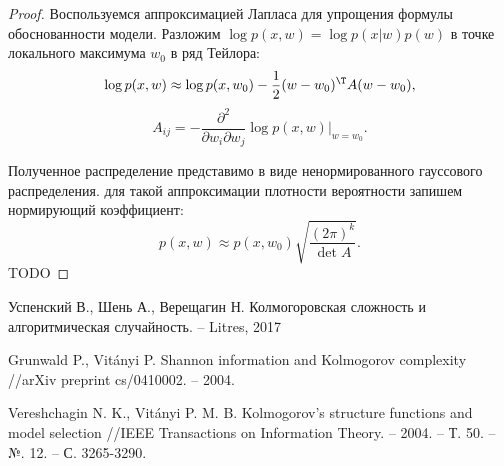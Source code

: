 \documentclass[../main.tex]{subfiles}
\begin{document}
\begin{proof}
Воспользуемся аппроксимацией Лапласа для упрощения формулы обоснованности модели.
Разложим $\log p(x, w) = \log p(x|w)p(w)$ в точке локального максимума $w_0$ в ряд Тейлора:
\[
    \log p(x,w) \approx \log p(x,w_0)  - \frac{1}{2} (w-w_0)^\T A (w-w_0),
\]
\[
    A_{ij} = -\frac{\partial^2}{\partial w_i \partial w_j}\log p(x,w)|_{w = w_0}.
\]

Полученное распределение представимо в виде ненормированного гауссового распределения. для такой аппроксимации плотности вероятности запишем нормирующий коэффициент: 
\[
    p(x,w) \approx p(x,w_0) \sqrt{\frac{(2\pi)^k}{\det A}}.
\]
TODO
\end{proof}
\begin{thebibliography}{99}
	Успенский В., Шень А., Верещагин Н. Колмогоровская сложность и алгоритмическая случайность. – Litres, 2017

Grunwald P., Vitányi P. Shannon information and Kolmogorov complexity //arXiv preprint cs/0410002. – 2004.

Vereshchagin N. K., Vitányi P. M. B. Kolmogorov's structure functions and model selection //IEEE Transactions on Information Theory. – 2004. – Т. 50. – №. 12. – С. 3265-3290.
\end{thebibliography}
\end{document}
